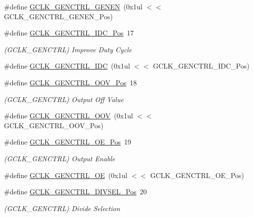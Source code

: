 \begin{DoxyCompactItemize}
\#define \mbox{\hyperlink{group___s_a_m_d21___g_c_l_k_gaaff89a081b47174a1ebf7893d638d911}{G\+C\+L\+K\+\_\+\+G\+E\+N\+C\+T\+R\+L\+\_\+\+G\+E\+N\+EN}}~(0x1ul $<$$<$ G\+C\+L\+K\+\_\+\+G\+E\+N\+C\+T\+R\+L\+\_\+\+G\+E\+N\+E\+N\+\_\+\+Pos)
\item 
\#define \mbox{\hyperlink{group___s_a_m_d21___g_c_l_k_gadd1c684492c64ddc0b937c7571028381}{G\+C\+L\+K\+\_\+\+G\+E\+N\+C\+T\+R\+L\+\_\+\+I\+D\+C\+\_\+\+Pos}}~17
\begin{DoxyCompactList}\small\item\em (G\+C\+L\+K\+\_\+\+G\+E\+N\+C\+T\+RL) Improve Duty Cycle \end{DoxyCompactList}\item 
\#define \mbox{\hyperlink{group___s_a_m_d21___g_c_l_k_ga20defe310838ae549c7f9820de38e1bb}{G\+C\+L\+K\+\_\+\+G\+E\+N\+C\+T\+R\+L\+\_\+\+I\+DC}}~(0x1ul $<$$<$ G\+C\+L\+K\+\_\+\+G\+E\+N\+C\+T\+R\+L\+\_\+\+I\+D\+C\+\_\+\+Pos)
\item 
\#define \mbox{\hyperlink{group___s_a_m_d21___g_c_l_k_ga511f960dfd2a4afa6dc073dc909389ac}{G\+C\+L\+K\+\_\+\+G\+E\+N\+C\+T\+R\+L\+\_\+\+O\+O\+V\+\_\+\+Pos}}~18
\begin{DoxyCompactList}\small\item\em (G\+C\+L\+K\+\_\+\+G\+E\+N\+C\+T\+RL) Output Off Value \end{DoxyCompactList}\item 
\#define \mbox{\hyperlink{group___s_a_m_d21___g_c_l_k_ga80c2684d81c5b9433098ae98bd7cc989}{G\+C\+L\+K\+\_\+\+G\+E\+N\+C\+T\+R\+L\+\_\+\+O\+OV}}~(0x1ul $<$$<$ G\+C\+L\+K\+\_\+\+G\+E\+N\+C\+T\+R\+L\+\_\+\+O\+O\+V\+\_\+\+Pos)
\item 
\#define \mbox{\hyperlink{group___s_a_m_d21___g_c_l_k_ga463727f09be9f9cf1f26c55e954eaf0e}{G\+C\+L\+K\+\_\+\+G\+E\+N\+C\+T\+R\+L\+\_\+\+O\+E\+\_\+\+Pos}}~19
\begin{DoxyCompactList}\small\item\em (G\+C\+L\+K\+\_\+\+G\+E\+N\+C\+T\+RL) Output Enable \end{DoxyCompactList}\item 
\#define \mbox{\hyperlink{group___s_a_m_d21___g_c_l_k_ga2d6d57ade8be094e5b3076e347eaabd7}{G\+C\+L\+K\+\_\+\+G\+E\+N\+C\+T\+R\+L\+\_\+\+OE}}~(0x1ul $<$$<$ G\+C\+L\+K\+\_\+\+G\+E\+N\+C\+T\+R\+L\+\_\+\+O\+E\+\_\+\+Pos)
\item 
\#define \mbox{\hyperlink{group___s_a_m_d21___g_c_l_k_gae17e18184623ee038ce57b64c63e4f9a}{G\+C\+L\+K\+\_\+\+G\+E\+N\+C\+T\+R\+L\+\_\+\+D\+I\+V\+S\+E\+L\+\_\+\+Pos}}~20
\begin{DoxyCompactList}\small\item\em (G\+C\+L\+K\+\_\+\+G\+E\+N\+C\+T\+RL) Divide Selection \end{DoxyCompactList}\item 

\end{DoxyCompactItemize}
